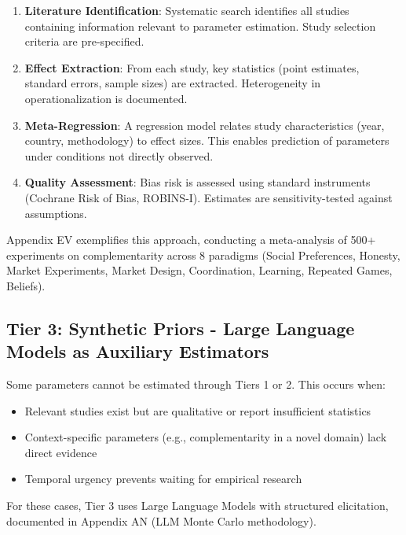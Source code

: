 \documentclass[12pt,oneside]{book}
\begin{document}
\begin{enumerate}

  \item \textbf{Literature Identification}: Systematic search identifies all studies containing
        information relevant to parameter estimation. Study selection criteria are pre-specified.

  \item \textbf{Effect Extraction}: From each study, key statistics (point estimates, standard errors,
        sample sizes) are extracted. Heterogeneity in operationalization is documented.

  \item \textbf{Meta-Regression}: A regression model relates study characteristics (year, country,
        methodology) to effect sizes. This enables prediction of parameters under conditions not
        directly observed.

  \item \textbf{Quality Assessment}: Bias risk is assessed using standard instruments (Cochrane
        Risk of Bias, ROBINS-I). Estimates are sensitivity-tested against assumptions.

\end{enumerate}

Appendix EV exemplifies this approach, conducting a meta-analysis of 500+ experiments on complementarity
across 8 paradigms (Social Preferences, Honesty, Market Experiments, Market Design, Coordination, Learning,
Repeated Games, Beliefs).

\subsection{Tier 3: Synthetic Priors - Large Language Models as Auxiliary Estimators}

Some parameters cannot be estimated through Tiers 1 or 2. This occurs when:

\begin{itemize}
  \item Relevant studies exist but are qualitative or report insufficient statistics
  \item Context-specific parameters (e.g., complementarity in a novel domain) lack direct evidence
  \item Temporal urgency prevents waiting for empirical research
\end{itemize}

For these cases, Tier 3 uses Large Language Models with structured elicitation, documented in Appendix AN
(LLM Monte Carlo methodology).
\end{document}
